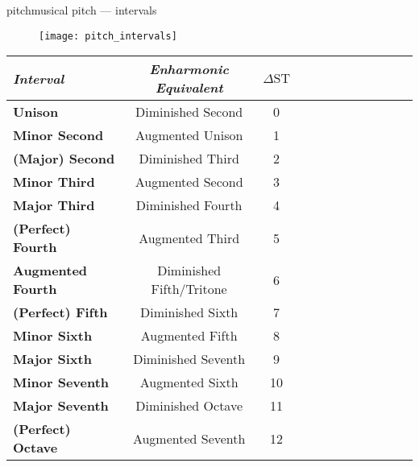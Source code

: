 	\begin{frame}{pitch}{musical pitch --- intervals}
		\vspace{-4mm}
        \begin{figure}
			\texttt{[image: pitch\_intervals]}
		\end{figure}

		\pause
		\vspace{-6mm}
		\begin{scriptsize}
			\begin{table}
				\centering
				\begin{tabular}{lccccccccccc} %
                    \\ \hline
                    \bf{\emph{Interval}}	 & \bf{\emph{Enharmonic Equivalent}}	 & \bf{\emph{$\Delta\mathrm{ST}$}}\\ 
                     \hline
                    \bf{Unison}	 & Diminished Second	 & 0\\
                    \bf{Minor Second}	 & Augmented Unison	 & 1\\
                    \bf{(Major) Second}	 & Diminished Third	 & 2\\
                    \bf{Minor Third}	 & Augmented Second	 & 3\\
                    \bf{Major Third}	 & Diminished Fourth	 & 4\\
                    \bf{(Perfect) Fourth}	 & Augmented Third	 & 5\\
                    \bf{Augmented Fourth}	 & Diminished Fifth/Tritone	 & 6\\
                    \bf{(Perfect) Fifth}	 & Diminished Sixth	 & 7\\
                    \bf{Minor Sixth}	 & Augmented Fifth	 & 8\\
                    \bf{Major Sixth}	 & Diminished Seventh	 & 9\\
                    \bf{Minor Seventh}	 & Augmented Sixth	 & 10\\
                    \bf{Major Seventh}	 & Diminished Octave	 & 11\\
                    \bf{(Perfect) Octave}	 & Augmented Seventh	 & 12\\
				\end{tabular}
			\end{table}
		\end{scriptsize}
	\end{frame}
	
